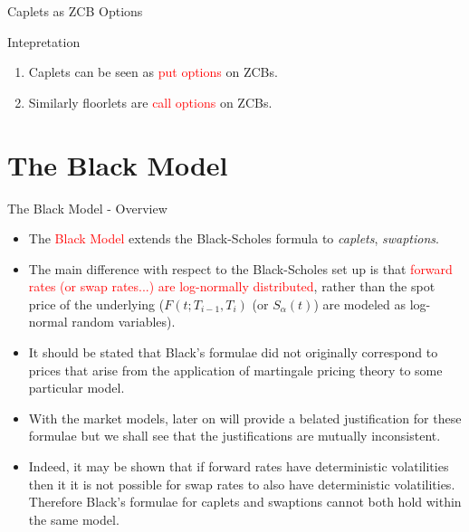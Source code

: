 \documentclass{beamer}
\begin{document}
\begin{frame}{Caplets as ZCB Options}
	\begin{block}{Intepretation}
		\begin{enumerate}
		\item Caplets can be seen as \textcolor{red}{put options} on ZCBs. 
		\item Similarly floorlets are \textcolor{red}{call options} on ZCBs.
		\end{enumerate}
	\end{block}
\end{frame}

\section{The Black Model}
\begin{frame}{The Black Model - Overview}
	\begin{itemize}
		\item The \textcolor{red}{Black Model} extends the Black-Scholes formula to \emph{caplets}, \emph{swaptions}. %
		\item The main difference with respect to the Black-Scholes set up is that \textcolor{red}{forward rates (or swap rates...) are log-normally distributed}, rather than the spot price of the underlying ($F(t;T_{i-1},T_i)$ (or $S_\alpha(t)$) are modeled as log-normal random variables). 
		\item It should be stated that Black’s formulae did not originally correspond to prices that arise from the application of martingale pricing theory to some particular model. 
		\item With the market models, later on will provide a belated justification for these formulae but we shall see that the justifications are mutually inconsistent. 
		\item Indeed, it may be shown that if forward rates have deterministic volatilities then it it is not possible for swap rates to also have deterministic volatilities. Therefore Black’s formulae for caplets and swaptions cannot both hold within the same model. 
	\end{itemize}
\end{frame}

\end{document}
